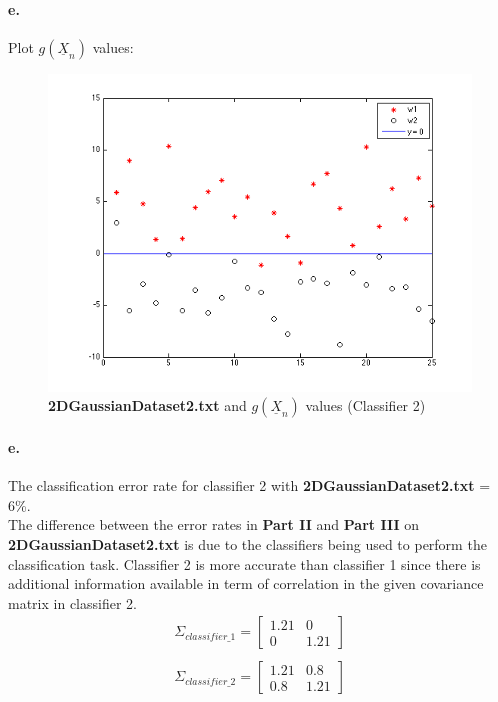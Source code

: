 \documentclass[a4paper]{article}
\begin{document}
\paragraph{e.} Plot $g(\underline{X}_{n})$ values: \\
\begin{figure}[H]
  \centering
    \includegraphics[scale=.6]{images/3_e.png}
  \caption{\textbf{2DGaussianDataset2.txt} and $g(\underline{X}_{n})$ values (Classifier 2)}
\end{figure}

\paragraph{e.} The classification error rate for classifier 2 with \textbf{2DGaussianDataset2.txt} = 6\%. \\

The difference between the error rates in \textbf{Part II} and \textbf{Part III} on \textbf{2DGaussianDataset2.txt} is due to the classifiers being used to perform the classification task. Classifier 2 is more accurate than classifier 1 since there is additional information available in term of correlation in the given covariance matrix in classifier 2. \\

\begin{align*}
\Sigma_{classifier\_1} = 
	\begin{bmatrix}
		1.21 & 0 \\
		0 & 1.21
	\end{bmatrix} \\ \\
\Sigma_{classifier\_2} = 
	\begin{bmatrix}
		1.21 & 0.8 \\
		0.8 & 1.21
	\end{bmatrix}
\end{align*}
\end{document}
